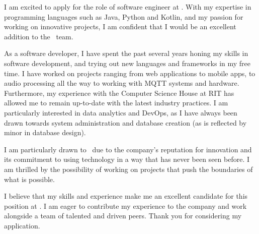 I am excited to apply for the role of software engineer at \company. With my expertise in programming languages such as Java, Python and Kotlin, and my passion for working on innovative projects, I am confident that I would be an excellent addition to the \company\ team.

As a software developer, I have spent the past several years honing my skills in software development, and trying out new languages and frameworks in my free time. I have worked on projects ranging from web applications to mobile apps, to audio processing all the way to working with MQTT systems and hardware. Furthermore, my experience with the Computer Science House at RIT has allowed me to remain up-to-date with the latest industry practices. I am particularly interested in data analytics and DevOps, as I have always been drawn towards system administration and database creation (as is reflected by minor in database design).

I am particularly drawn to \company\ due to the company's reputation for innovation and its commitment to using technology in a way that has never been seen before. I am thrilled by the possibility of working on projects that push the boundaries of what is possible.

I believe that my skills and experience make me an excellent candidate for this position at \company. I am eager to contribute my experience to the company and work alongside a team of talented and driven peers. Thank you for considering my application.

